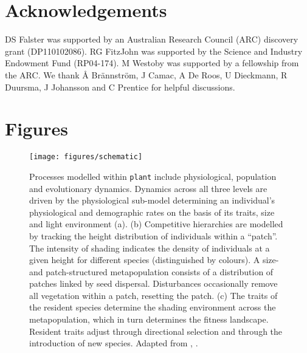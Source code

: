 \documentclass[a4paper,11pt]{article}
\newcommand{\plant}{\texttt{plant}}
\begin{document}
\section{Acknowledgements}

DS Falster was supported by an Australian Research Council (ARC)
discovery grant (DP110102086). RG FitzJohn was supported by the
Science and Industry Endowment Fund (RP04-174). M Westoby was
supported by a fellowship from the ARC. We thank {\AA}
Br{\"a}nnstr{\"o}m, J Camac, A De Roos, U Dieckmann, R Duursma, J
Johansson and C Prentice for helpful discussions.

\clearpage


\clearpage

\section{Figures}\label{figures}

\begin{figure}[h!]
\centering
\texttt{[image: figures/schematic]}

\caption{Processes modelled within {\plant} include physiological, population and
evolutionary dynamics.
Dynamics across all three levels are driven by the
physiological sub-model determining an individual's physiological and
demographic rates on the basis of its traits, size and light environment (a).
(b) Competitive hierarchies  are modelled by tracking the height distribution of
individuals within a ``patch''. The intensity
of shading indicates the density of individuals at a given height for
different species (distinguished by colours). A size- and patch-structured
metapopulation consists of a distribution of patches linked by seed dispersal.
Disturbances occasionally remove all vegetation within a patch, resetting the
patch. (c) The traits of the resident species determine the shading environment
across the metapopulation, which in turn determines the fitness landscape.
Resident traits adjust through directional selection
and through the introduction of new species. Adapted from
\citet{Falster-2011}, \citet{Falster-2015}. }

\label{fig:schematic}
\end{figure}

\newpage
\end{document}
